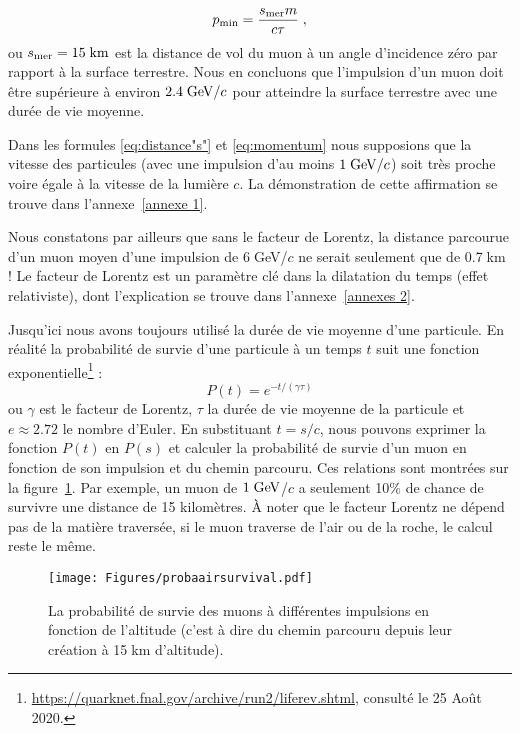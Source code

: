\documentclass[a4paper, 12pt]{article}
\begin{document}
\begin{spacing}{1.5}
\begin{equation}
\label{eq:momentum}
p_{\rm min} = \frac{s_{\rm mer}m}{c\tau}\;,
\end{equation}
ou $s_{\rm mer}=15\;{\rm km}$ est la distance de vol du muon à un angle d'incidence zéro par rapport à la surface terrestre. Nous en concluons que l'impulsion d'un muon doit être supérieure à environ $2.4\;{\rm GeV}/c$ pour atteindre la surface terrestre avec une durée de vie moyenne. 

Dans les formules \ref{eq:distance"s"} et \ref{eq:momentum} nous supposions que la vitesse des particules (avec une impulsion d'au moins $1\;{\rm GeV}/c$) soit très proche voire égale à la vitesse de la lumière $c$. La démonstration de cette affirmation se trouve dans l'annexe~\ref{annexe 1}. 

Nous constatons par ailleurs que sans le facteur de Lorentz, la distance parcourue d'un muon moyen d'une impulsion de $6\;$GeV/$c$ ne serait seulement que de 0.7$\;$km ! Le facteur de Lorentz est un paramètre clé dans la dilatation du temps (effet relativiste), dont l'explication se trouve dans l'annexe~\ref{annexes 2}.

Jusqu'ici nous avons toujours utilisé la durée de vie moyenne d'une particule. En réalité la probabilité de survie d'une particule à un temps $t$ suit une fonction exponentielle\footnote{\url{https://quarknet.fnal.gov/archive/run2/liferev.shtml}, consulté le 25 Août 2020.} : 
\begin{equation}
P(t)=e^{-t/(\gamma\tau)}
\label{eq:decay}
\end{equation}
ou $\gamma$ est le facteur de Lorentz, $\tau$ la durée de vie moyenne de la particule et $e\approx2.72$ le nombre d'Euler. En substituant $t = s/c$, nous pouvons exprimer la fonction $P(t)$ en $P(s)$ et calculer la probabilité de survie d'un muon en fonction de son impulsion et du chemin parcouru. Ces relations sont montrées sur la figure~\ref{fig:probaairsurvival}. Par exemple, un muon de $1\;{\rm GeV}$/$c$ a seulement 10\% de chance de survivre une distance de 15 kilomètres. À noter que le facteur Lorentz ne dépend pas de la matière traversée, si le muon traverse de l'air ou de la roche, le calcul reste le même.
\begin{figure}
\begin{center}
\texttt{[image: Figures/probaairsurvival.pdf]}
\caption{\label{fig:probaairsurvival} La probabilité de survie des muons à différentes impulsions en fonction de l'altitude (c'est à dire du chemin parcouru depuis leur création à 15$\;$km d'altitude).}
\end{center}
\end{figure}



\end{spacing}
\end{document}
